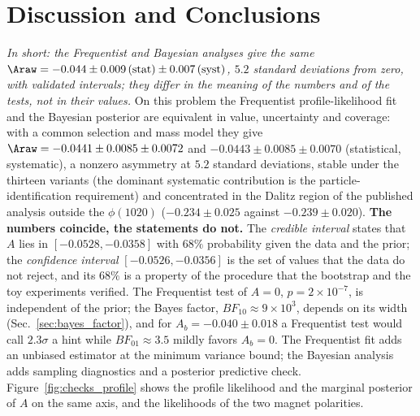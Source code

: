 \section{Discussion and Conclusions}
\label{sec:conclusions}
\label{sec:comparison}
\emph{In short: the Frequentist and Bayesian analyses give the same $\Araw=-0.044\pm0.009\,(\text{stat})\pm0.007\,(\text{syst})$, $5.2$ standard deviations from zero, with validated intervals; they differ in the meaning of the numbers and of the tests, not in their values.}
On this problem the Frequentist profile-likelihood fit and the Bayesian posterior are equivalent in value, uncertainty and coverage: with a common selection and mass model they give $\Araw=-0.0441\pm0.0085\pm0.0072$ and $-0.0443\pm0.0085\pm0.0070$ (statistical, systematic), a nonzero asymmetry at $5.2$ standard deviations, stable under the thirteen variants (the dominant systematic contribution is the particle-identification requirement) and concentrated in the Dalitz region of the published analysis outside the $\phi(1020)$ ($-0.234\pm0.025$ against $-0.239\pm0.020$).
\textbf{The numbers coincide, the statements do not.} The \emph{credible interval} states that $A$ lies in $[-0.0528,-0.0358]$ with $68\%$ probability given the data and the prior; the \emph{confidence interval} $[-0.0526,-0.0356]$ is the set of values that the data do not reject, and its $68\%$ is a property of the procedure that the bootstrap and the toy experiments verified. The Frequentist test of $A=0$, $p=2\times10^{-7}$, is independent of the prior; the Bayes factor, $BF_{10}\approx9\times10^3$, depends on its width (Sec.~\ref{sec:bayes_factor}), and for $A_b=-0.040\pm0.018$ a Frequentist test would call $2.3\sigma$ a hint while $BF_{01}\approx3.5$ mildly favors $A_b=0$. The Frequentist fit adds an unbiased estimator at the minimum variance bound; the Bayesian analysis adds sampling diagnostics and a posterior predictive check. Figure~\ref{fig:checks_profile} shows the profile likelihood and the marginal posterior of $A$ on the same axis, and the likelihoods of the two magnet polarities.

